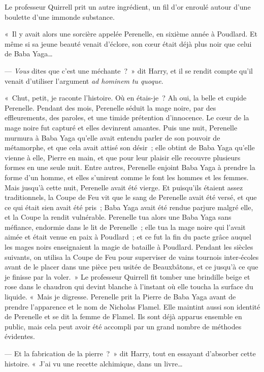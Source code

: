 Le professeur Quirrell prit un autre ingrédient, un fil d'or enroulé autour d'une boulette d'une immonde substance.

«~Il y avait alors une sorcière appelée Perenelle, en sixième année à Poudlard.
Et même si sa jeune beauté venait d'éclore, son cœur était déjà plus noir que celui de Baba Yaga…

--- \emph{Vous} dites que c'est une méchante~?~»
dit Harry, et il se rendit compte qu'il venait d'utiliser l'argument \emph{ad hominem} \emph{tu quoque}.

«~Chut, petit, je raconte l'histoire.
Où en étais-je~?
Ah oui, la belle et cupide Perenelle.
Pendant des mois, Perenelle séduit la mage noire, par des effleurements, des paroles, et une timide prétention d'innocence.
Le cœur de la mage noire fut capturé et elles devinrent amantes.
Puis une nuit, Perenelle murmura à Baba Yaga qu'elle avait entendu parler de son pouvoir de métamorphe, et que cela avait attisé son désir~; elle obtint de Baba Yaga qu'elle vienne à elle, Pierre en main, et que pour leur plaisir elle recouvre plusieurs formes en une seule nuit.
Entre autres, Perenelle enjoint Baba Yaga à prendre la forme d'un homme, et elles s'unirent comme le font les hommes et les femmes.
Mais jusqu'à cette nuit, Perenelle avait été vierge.
Et puisqu'ils étaient assez traditionnels, la Coupe de Feu vit que le sang de Perenelle avait été versé, et que ce qui était sien avait été pris~; Baba Yaga avait été rendue parjure malgré elle, et la Coupe la rendit vulnérable.
Perenelle tua alors une Baba Yaga sans méfiance, endormie dans le lit de Perenelle~; elle tua la mage noire qui l'avait aimée et était venue en paix à Poudlard~; et ce fut la fin du pacte grâce auquel les mages noirs enseignaient la magie de bataille à Poudlard.
Pendant les siècles suivants, on utilisa la Coupe de Feu pour superviser de vains tournois inter-écoles avant de le placer dans une pièce peu usitée de Beauxbâtons, et ce jusqu'à ce que je finisse par la voler.~»
Le professeur Quirrell fit tomber une brindille beige et rose dans le chaudron qui devint blanche à l'instant où elle toucha la surface du liquide.
«~Mais je digresse.
Perenelle prit la Pierre de Baba Yaga avant de prendre l'apparence et le nom de Nicholas Flamel.
Elle maintint aussi son identité de Perenelle et se dit la femme de Flamel.
Ils sont déjà apparus ensemble en public, mais cela peut avoir été accompli par un grand nombre de méthodes évidentes.

--- Et la fabrication de la pierre~?~»
dit Harry, tout en essayant d'absorber cette histoire.
«~J'ai vu une recette alchimique, dans un livre…

